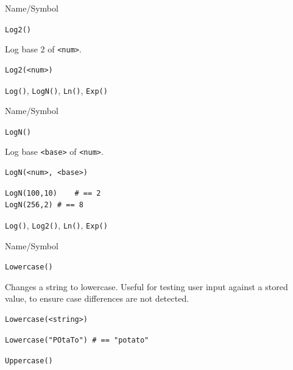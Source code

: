 \begin{desc}{Name/Symbol}
\item[Name/Symbol]	\verb+Log2()+

\item[Description]	Log base 2 of \verb+<num>+.

\item[Usage]
\begin{verbatim}
Log2(<num>)
\end{verbatim}

\item[Example]	

\item[See Also]	\verb+Log()+, \verb+LogN()+, \verb+Ln()+, \verb+Exp()+
\end{desc}

\begin{desc}{Name/Symbol}
\item[Name/Symbol]	\verb+LogN()+

\item[Description]	Log base \verb+<base>+ of \verb+<num>+.

\item[Usage]
\begin{verbatim}
LogN(<num>, <base>)
\end{verbatim}

\item[Example]
\begin{verbatim}
LogN(100,10)	# == 2
LogN(256,2)	# == 8
\end{verbatim}

\item[See Also]	\verb+Log()+, \verb+Log2()+, \verb+Ln()+, \verb+Exp()+
\end{desc}

\begin{desc}{Name/Symbol}
\item[Name/Symbol]	\verb+Lowercase()+

\item[Description]	Changes a string to lowercase.  Useful for testing user
		input against a stored value, to ensure case differences
		are not detected.

\item[Usage]
\begin{verbatim}
Lowercase(<string>)
\end{verbatim}

\item[Example]
\begin{verbatim}
Lowercase("POtaTo")	# == "potato"
\end{verbatim}

\item[See Also]	\verb+Uppercase()+
\end{desc}

